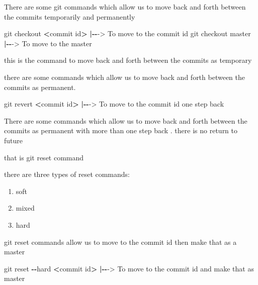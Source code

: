 \documentclass[
]{article}
\newenvironment{Shaded}{\begin{snugshade}}{\end{snugshade}}
\newcommand{\ErrorTok}[1]{\textcolor[rgb]{0.64,0.00,0.00}{\textbf{#1}}}
\newcommand{\NormalTok}[1]{#1}
\newcommand{\OtherTok}[1]{\textcolor[rgb]{0.56,0.35,0.01}{#1}}
\newcommand{\SpecialCharTok}[1]{\textcolor[rgb]{0.81,0.36,0.00}{\textbf{#1}}}
\begin{document}
There are some git commands which allow us to move back and forth
between the commits temporarily and permanently

\begin{Shaded}
\begin{Highlighting}[]
\NormalTok{git checkout }\SpecialCharTok{\textless{}}\NormalTok{commit id}\SpecialCharTok{\textgreater{}}  \ErrorTok{|}\SpecialCharTok{{-}{-}}\OtherTok{{-}\textgreater{}}\NormalTok{ To move to the commit id}
\NormalTok{git checkout master       }\SpecialCharTok{|{-}{-}}\OtherTok{{-}\textgreater{}}\NormalTok{ To move to the master}
\end{Highlighting}
\end{Shaded}

this is the command to move back and forth between the commits as
temporary

there are some commands which allow us to move back and forth between
the commits as permanent.

\begin{Shaded}
\begin{Highlighting}[]
\NormalTok{git revert }\SpecialCharTok{\textless{}}\NormalTok{commit id}\SpecialCharTok{\textgreater{}}    \ErrorTok{|}\SpecialCharTok{{-}{-}}\OtherTok{{-}\textgreater{}}\NormalTok{ To move to the commit id one step back }
\end{Highlighting}
\end{Shaded}

There are some commands which allow us to move back and forth between
the commits as permanent with more than one step back . there is no
return to future

\newpage

that is git reset command

there are three types of reset commands:

\begin{enumerate}
\def\labelenumi{\arabic{enumi}.}
\item
  soft
\item
  mixed
\item
  hard
\end{enumerate}

git reset commands allow us to move to the commit id then make that as a
master

\begin{Shaded}
\begin{Highlighting}[]
\NormalTok{git reset }\SpecialCharTok{{-}{-}}\NormalTok{hard }\SpecialCharTok{\textless{}}\NormalTok{commit id}\SpecialCharTok{\textgreater{}} \ErrorTok{|}\SpecialCharTok{{-}{-}}\OtherTok{{-}\textgreater{}}\NormalTok{ To move to the commit id and make that as master}
\end{Highlighting}
\end{Shaded}
\end{document}
